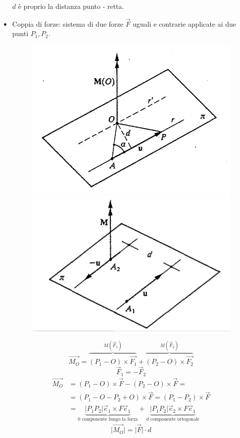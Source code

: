 \documentclass{article}
\begin{document}
\begin{adjustwidth}{2in}{}
\begin{itemize}
	$d$ è proprio la distanza punto - retta. \newline 
	
	\item Coppia di forze: sistema di due forze $\vec{F}$ uguali e contrarie applicate ai due punti $P_{1}, P_{2}$.
	\begin{figure} [H]
		\centering
		\includegraphics[scale=0.2]{immagini/image-012}
		\includegraphics[scale=0.2]{immagini/image-013}
	\end{figure}
	
		\[
		\vec{M_{O}} = \overbrace{(P_{1}-O)\times \vec{F_{1}}}^\text{$M(\vec{F}_1)$} + \overbrace{(P_{2}-O)\times \vec{F_{2}}}^\text{$M(\vec{F}_2)$}
		\] 
		\[\vec{F}_1 = -\vec{F}_2\]
	\[
	\begin{split}
			\vec{M_{O}}	& = (P_{1}-O)\times \vec{F} - (P_{2}-O)\times \vec{F} =\\
		& = (P_{1}- O - P_{2} + O) \times \vec{F} = (P_{1} - P_{2})\times \vec{F} \\
		& = \underbrace{|P_1P_2|\vec{e}_1 \times F\vec{e}_1}_\text{$0$ componente lungo la forza} + \underbrace{|P_1P_2|\vec{e}_2 \times F\vec{e}_1}_\text{$d$ componente ortogonale}
	\end{split}
	\]
	\[\vert\vec{M_{O}}\vert = \vert\vec{F}\vert \cdot d\]
	

\end{itemize}
\end{adjustwidth}
\end{document}
